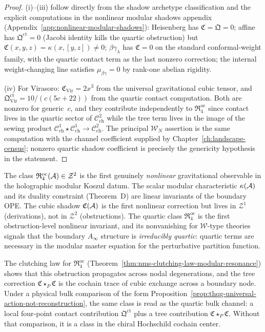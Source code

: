 \begin{proof}
(i)--(iii) follow directly from the shadow archetype classification
and the explicit computations in the nonlinear modular shadows
appendix (Appendix~\ref{app:nonlinear-modular-shadows}):
Heisenberg has $\mathfrak{C} = \mathfrak{Q} = 0$;
affine has $\mathfrak{Q}^{\mathrm{ct}} = 0$ (Jacobi identity kills
the quartic obstruction) but
$\mathfrak{C}(x, y, z) = \kappa(x, [y, z]) \neq 0$;
$\beta\gamma_\lambda$ has $\mathfrak{C} = 0$ on the standard
conformal-weight family, with the quartic contact term as the last
nonzero correction; the internal weight-changing line satisfies
$\mu_{\beta\gamma} = 0$ by rank-one abelian rigidity.

(iv) For Virasoro: $\mathfrak{C}_{\mathrm{Vir}} = 2x^3$ from
the universal gravitational cubic tensor, and
$\mathfrak{Q}^{\mathrm{ct}}_{\mathrm{Vir}}
= 10 / (c(5c + 22))$ from the quartic contact computation.
Both are nonzero for generic~$c$, and they contribute independently
to $\mathfrak{R}^{\mathrm{oc}}_4$ since contact lives in the quartic
sector of $\mathcal{C}^2_{\mathrm{ch}}$ while the tree term lives
in the image of the sewing product
$\mathcal{C}^1_{\mathrm{ch}} \star \mathcal{C}^1_{\mathrm{ch}}
\to \mathcal{C}^2_{\mathrm{ch}}$.
The principal $\mathcal{W}_N$ assertion is the same computation
with the channel coefficient supplied by
Chapter~\ref{ch:landscape-census}; nonzero quartic shadow
coefficient is precisely the genericity hypothesis in the statement.
\end{proof}

\begin{remark}
\label{rem:thqg-oc-gravitational-observable}
The class $\mathfrak{R}^{\mathrm{oc}}_4(\mathcal{A}) \in \mathcal{Z}^2$
is the first genuinely \emph{nonlinear} gravitational observable
in the holographic modular Koszul datum. The scalar modular
characteristic $\kappa(\mathcal{A})$ and its duality constraint (Theorem~D)
are linear invariants of the boundary OPE. The cubic shadow
$\mathfrak{C}(\mathcal{A})$ is the first nonlinear correction but lives
in $\mathcal{Z}^1$ (derivations), not in $\mathcal{Z}^2$
(obstructions). The quartic class $\mathfrak{R}^{\mathrm{oc}}_4$
is the first obstruction-level nonlinear invariant, and its
nonvanishing for $\mathcal{W}$-type theories signals that the
boundary $A_\infty$ structure is \emph{irreducibly quartic}:
quartic terms are necessary in the modular master equation for the
perturbative partition function.

The clutching law for $\mathfrak{R}^{\mathrm{oc}}_4$
(Theorem~\ref{thm:nms-clutching-law-modular-resonance}) shows
that this obstruction propagates across nodal degenerations,
and the tree correction $\mathfrak{C} \star_P \mathfrak{C}$ is
the cochain trace of cubic exchange across a boundary node. Under a
physical bulk comparison of the form
Proposition~\ref{prop:thqg-universal-action-not-reconstruction},
the same class is read as the quartic bulk channel: a local
four-point contact contribution
$\mathfrak{Q}^{\mathrm{ct}}$ plus a tree contribution
$\mathfrak{C} \star_P \mathfrak{C}$. Without that comparison, it is
a class in the chiral Hochschild cochain center.
\end{remark}

